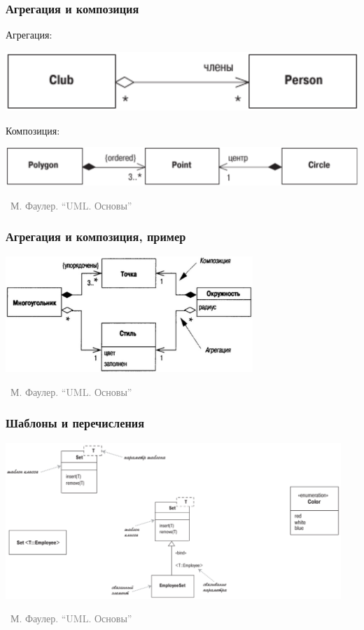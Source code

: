 \documentclass[xetex,mathserif,serif]{beamer}
\newcommand{\attribution}[1] {
	\vspace{-5mm}\begin{flushright}\begin{scriptsize}\textcolor{gray}{\textcopyright\, #1}\end{scriptsize}\end{flushright}
}
\begin{document}
	\begin{frame}
		\frametitle{Агрегация и композиция}
		Агрегация:
		\begin{center}
			\includegraphics[height=0.1\textheight]{aggregation.png}
		\end{center}
		\vspace{5mm}
		Композиция:
		\begin{center}
			\includegraphics[height=0.1\textheight]{composition.png}
		\end{center}
		\attribution{М. Фаулер. ``UML. Основы''}
	\end{frame}

	\begin{frame}
		\frametitle{Агрегация и композиция, пример}
		\begin{center}
			\includegraphics[width=0.7\textwidth]{aggregationAndCompositionExample.png}
			\attribution{М. Фаулер. ``UML. Основы''}
		\end{center}
	\end{frame}

	\begin{frame}
		\frametitle{Шаблоны и перечисления}
		\begin{center}
			\includegraphics[width=0.95\textwidth]{genericsAndEnums.png}
			\attribution{М. Фаулер. ``UML. Основы''}
		\end{center}
	\end{frame}
\end{document}
